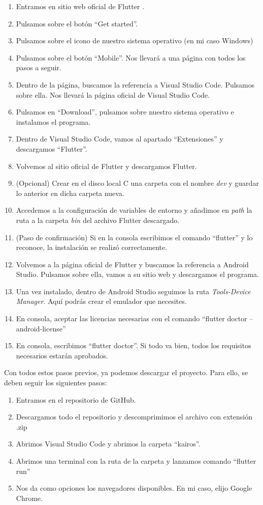 	\begin{enumerate}
		\item Entramos en sitio web oficial de Flutter \cite{flutter}.
		\item Pulsamos sobre el botón ``Get started''.
		\item Pulsamos sobre el icono de nuestro sistema operativo (en mi caso Windows)
		\item Pulsamos sobre el botón ``Mobile''. Nos llevará a una página con todos los pasos a seguir.
		\item Dentro de la página, buscamos la referencia a Visual Studio Code. Pulsamos sobre ella. Nos llevará la página oficial de Visual Studio Code.
		\item Pulsamos en ``Download'', pulsamos sobre nuestro sistema operativo e instalamos el programa.
		\item Dentro de Visual Studio Code, vamos al apartado ``Extensiones'' y descargamos ``Flutter''.
		\item Volvemos al sitio oficial de Flutter y descargamos Flutter.
		\item (Opcional) Crear en el disco local C una carpeta con el nombre \emph{dev} y guardar lo anterior en dicha carpeta nueva.
		\item Accedemos a la configuración de variables de entorno y añadimos en \emph{path} la ruta a la carpeta \emph{bin} del archivo Flutter descargado.
		\item (Paso de confirmación) Si en la consola escribimos el comando ``flutter'' y lo reconoce, la instalación se realizó correctamente.
		\item Volvemos a la página oficial de Flutter y buscamos la referencia a Android Studio. Pulsamos sobre ella, vamos a su sitio web y descargamos el programa.
		\item Una vez instalado, dentro de Android Studio seguimos la ruta \emph{Tools-Device Manager}. Aquí podrás crear el emulador que necesites.
		\item En consola, aceptar las licencias necesarias con el comando ``flutter doctor --android-license''
		\item En consola, escribimos ``flutter doctor''. Si todo va bien, todos los requisitos necesarios estarán aprobados.
	\end{enumerate}
	
	Con todos estos pasos previos, ya podemos descargar el proyecto. Para ello, se deben seguir los siguientes pasos:
	\begin{enumerate}
		\item Entramos en el repositorio de GitHub.
		\item Descargamos todo el repositorio y descomprimimos el archivo con extensión .zip
		\item Abrimos Visual Studio Code y abrimos la carpeta ``kairos''.
		\item Abrimos una terminal con la ruta de la carpeta y lanzamos comando ``flutter run''
		\item Nos da como opciones los navegadores disponibles. En mi caso, elijo Google Chrome.
	\end{enumerate}
	
